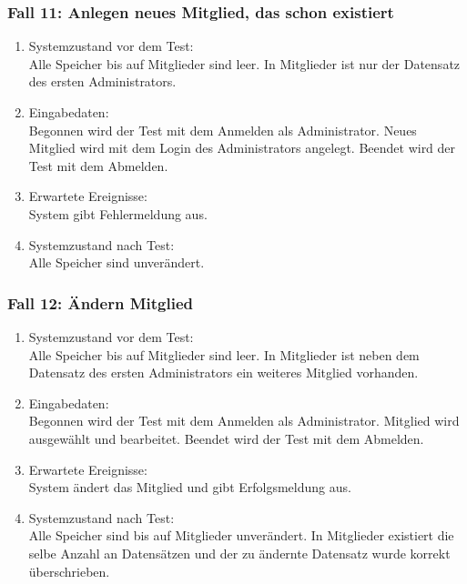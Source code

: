 \subsubsection{Fall 11: Anlegen neues Mitglied, das schon existiert}
\begin{enumerate}
\item Systemzustand vor dem Test:\\
	Alle Speicher bis auf Mitglieder sind leer. In Mitglieder ist nur der Datensatz des ersten Administrators.
\item Eingabedaten:\\
	Begonnen wird der Test mit dem Anmelden als Administrator. Neues Mitglied wird mit dem Login des Administrators angelegt. Beendet wird der Test mit dem Abmelden.
\item Erwartete Ereignisse:\\
	System gibt Fehlermeldung aus.
\item Systemzustand nach Test:\\
	Alle Speicher sind unverändert.
\end{enumerate}

\subsubsection{Fall 12: Ändern Mitglied}
\begin{enumerate}
\item Systemzustand vor dem Test:\\
	Alle Speicher bis auf Mitglieder sind leer. In Mitglieder ist neben dem Datensatz des ersten Administrators ein weiteres Mitglied vorhanden.
\item Eingabedaten:\\
	Begonnen wird der Test mit dem Anmelden als Administrator. Mitglied wird ausgewählt und bearbeitet. Beendet wird der Test mit dem Abmelden.
\item Erwartete Ereignisse:\\
	System ändert das Mitglied und gibt Erfolgsmeldung aus.
\item Systemzustand nach Test:\\
	Alle Speicher sind bis auf Mitglieder unverändert. In Mitglieder existiert die selbe Anzahl an Datensätzen und der zu ändernte Datensatz wurde korrekt überschrieben.
\end{enumerate}

